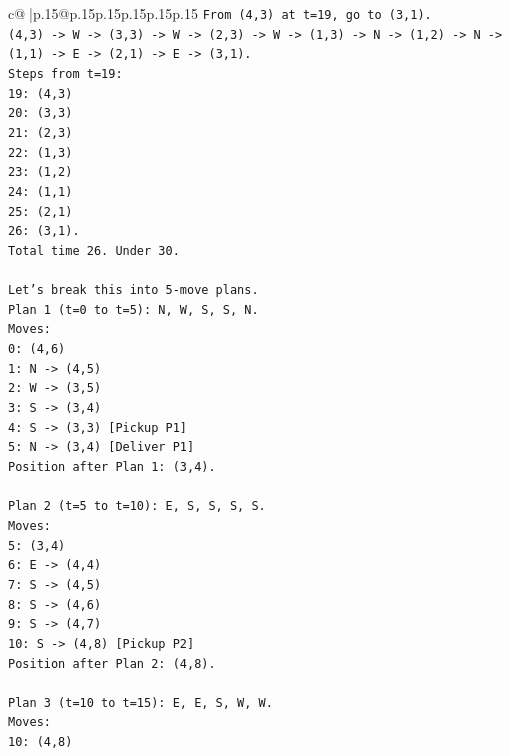 \documentclass{article}
\begin{document}
{\begin{supertabular}{c@{$\;$}|p{.15\linewidth}@{}p{.15\linewidth}p{.15\linewidth}p{.15\linewidth}p{.15\linewidth}p{.15\linewidth}}
{{{\texttt{From (4,3) at t=19, go to (3,1).} \\
\texttt{(4,3) {-}> W {-}> (3,3) {-}> W {-}> (2,3) {-}> W {-}> (1,3) {-}> N {-}> (1,2) {-}> N {-}> (1,1) {-}> E {-}> (2,1) {-}> E {-}> (3,1).} \\
\texttt{Steps from t=19:} \\
\texttt{19: (4,3)} \\
\texttt{20: (3,3)} \\
\texttt{21: (2,3)} \\
\texttt{22: (1,3)} \\
\texttt{23: (1,2)} \\
\texttt{24: (1,1)} \\
\texttt{25: (2,1)} \\
\texttt{26: (3,1).} \\
\texttt{Total time 26. Under 30.} \\
\\ 
\texttt{Let's break this into 5{-}move plans.} \\
\texttt{Plan 1 (t=0 to t=5): N, W, S, S, N.} \\
\texttt{Moves:} \\
\texttt{0: (4,6)} \\
\texttt{1: N {-}> (4,5)} \\
\texttt{2: W {-}> (3,5)} \\
\texttt{3: S {-}> (3,4)} \\
\texttt{4: S {-}> (3,3) {[}Pickup P1{]}} \\
\texttt{5: N {-}> (3,4) {[}Deliver P1{]}} \\
\texttt{Position after Plan 1: (3,4).} \\
\\ 
\texttt{Plan 2 (t=5 to t=10): E, S, S, S, S.} \\
\texttt{Moves:} \\
\texttt{5: (3,4)} \\
\texttt{6: E {-}> (4,4)} \\
\texttt{7: S {-}> (4,5)} \\
\texttt{8: S {-}> (4,6)} \\
\texttt{9: S {-}> (4,7)} \\
\texttt{10: S {-}> (4,8) {[}Pickup P2{]}} \\
\texttt{Position after Plan 2: (4,8).} \\
\\ 
\texttt{Plan 3 (t=10 to t=15): E, E, S, W, W.} \\
\texttt{Moves:} \\
\texttt{10: (4,8)} \\
}}}
\end{supertabular}}
\end{document}
